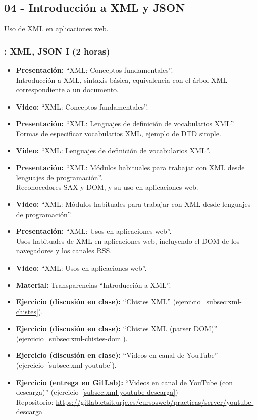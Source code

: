 \documentclass[a4paper,12pt]{article}
\begin{document}
\subsection{04 - Introducción a XML y JSON}

Uso de XML en aplicaciones web.

\subsubsection{\lunesJ: XML, JSON I (2 horas)}
\label{cal:lunesJ}

\begin{itemize}
\item \textbf{Presentación:} ``XML: Conceptos fundamentales''. \\
  Introducción a XML, sintaxis básica, equivalencia con el árbol XML correspondiente a un documento.
\item \textbf{Video:} ``XML: Conceptos fundamentales''.

\item \textbf{Presentación:} ``XML: Lenguajes de definición de vocabularios XML''. \\
  Formas de especificar vocabularios XML, ejemplo de DTD simple.
\item \textbf{Video:} ``XML: Lenguajes de definición de vocabularios XML''.
\item \textbf{Presentación:} ``XML: Módulos habituales para trabajar con XML desde lenguajes de programación''. \\
  Reconocedores SAX y DOM, y su uso en aplicaciones web.
\item \textbf{Video:} ``XML: Módulos habituales para trabajar con XML desde lenguajes de programación''.
\item \textbf{Presentación:} ``XML: Usos en aplicaciones web''. \\
  Usos habituales de XML en aplicaciones web, incluyendo el DOM de los navegadores y los canales RSS.
\item \textbf{Video:} ``XML: Usos en aplicaciones web''.
\item \textbf{Material:} Transparencias ``Introducción a XML''.
\item \textbf{Ejercicio (discusión en clase):} ``Chistes XML'' (ejercicio~\ref{subsec:xml-chistes}).
\item \textbf{Ejercicio (discusión en clase):} ``Chistes XML (parser DOM)'' (ejercicio~\ref{subsec:xml-chistes-dom}).
\item \textbf{Ejercicio (discusión en clase):} ``Videos en canal de YouTube'' (ejercicio~\ref{subsec:xml-youtube}).
\item \textbf{Ejercicio (entrega en GitLab):} ``Videos en canal de YouTube (con descarga)'' (ejercicio~\ref{subsec:xml-youtube-descarga}) \\
  Repositorio: \url{https://gitlab.etsit.urjc.es/cursosweb/practicas/server/youtube-descarga}
\end{itemize}
\end{document}
